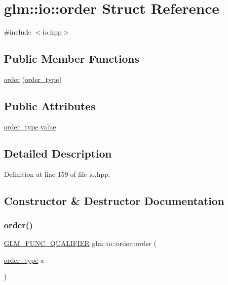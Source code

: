 \hypertarget{structglm_1_1io_1_1order}{}\section{glm\+:\+:io\+:\+:order Struct Reference}
\label{structglm_1_1io_1_1order}


{\ttfamily \#include $<$io.\+hpp$>$}

\subsection*{Public Member Functions}
\begin{DoxyCompactItemize}
\item 
\hyperlink{structglm_1_1io_1_1order_a06813d404c975865fdd3a77146268a1f}{order} (\hyperlink{namespaceglm_1_1io_a3497781803fe594a37177e05ab2a795f}{order\+\_\+type})
\end{DoxyCompactItemize}
\subsection*{Public Attributes}
\begin{DoxyCompactItemize}
\item 
\hyperlink{namespaceglm_1_1io_a3497781803fe594a37177e05ab2a795f}{order\+\_\+type} \hyperlink{structglm_1_1io_1_1order_aa8788dd0568bacd081d02bd5aca9889b}{value}
\end{DoxyCompactItemize}


\subsection{Detailed Description}


Definition at line 159 of file io.\+hpp.



\subsection{Constructor \& Destructor Documentation}
\mbox{\label{structglm_1_1io_1_1order_a06813d404c975865fdd3a77146268a1f}} 
\subsubsection{\texorpdfstring{order()}{order()}}
{\footnotesize\ttfamily \hyperlink{setup_8hpp_a33fdea6f91c5f834105f7415e2a64407}{G\+L\+M\+\_\+\+F\+U\+N\+C\+\_\+\+Q\+U\+A\+L\+I\+F\+I\+ER} glm\+::io\+::order\+::order (\begin{DoxyParamCaption}\item[{\hyperlink{namespaceglm_1_1io_a3497781803fe594a37177e05ab2a795f}{order\+\_\+type}}]{a }\end{DoxyParamCaption})\hspace{0.3cm}{\ttfamily [explicit]}}



